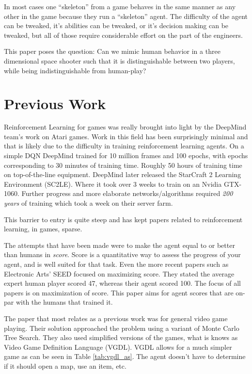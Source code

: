 \documentclass[12pt]{thesis}
\begin{document}
In most cases one ``skeleton'' from a game behaves in the same manner as any 
other in the game because they run a ``skeleton'' agent. The difficulty of the 
agent can be tweaked, it's abilities can be tweaked, or it's decision making 
can be tweaked, but all of those require considerable effort on the part of the 
engineers.

This paper poses the question: Can we mimic human behavior in a three 
dimensional space shooter such that it is distinguishable between two players, 
while being indistinguishable from human-play?



\chapter{Previous Work}
Reinforcement Learning for games was really brought into light by the DeepMind 
team's work on Atari games\cite{Atari_DM}. Work in this field has been 
surprisingly minimal and that is likely due to the difficulty in training 
reinforcement learning agents. On a simple DQN DeepMind trained for 10 million 
frames and 100 epochs, with epochs corresponding to 30 minutes of training time. 
Roughly 50 hours of training time on top-of-the-line equipment. DeepMind later 
released the StarCraft 2 Learning Environment (SC2LE)\cite{SC2LE}. Where it 
took over 3 weeks to train on an Nvidia GTX-1060. Further progress and more 
elaborate networks/algorithms required \textit{200 years} of training which 
took a week on their server farm.

This barrier to entry is quite steep and has kept papers related to 
reinforcement learning, in games, sparse.

The attempts that have been made were to make the agent equal to or better than 
humans in \textit{score}. Score is a quantitative way to assess the progress of 
your agent, and is well suited for that task. Even the more recent papers such 
as Electronic Arts' SEED\cite{EA_SEED} focused on maximizing score. They stated 
the average expert human player scored 47, whereas their agent scored 100. The 
focus of all papers is on maximization of score. This paper aims for agent 
scores that are on-par with the humans that trained it.

The paper that most relates as a previous work was for general video game 
playing\cite{Human-Like}. Their solution approached the problem using a variant 
of Monte Carlo Tree Search. They also used simplified versions of the games, 
what is knows as Video Game Definition Language (VGDL). VGDL allows for a much 
simpler game as can be seen in Table \ref{tab:vgdl_as}. The agent doesn't have 
to determine if it should open a map, use an item, etc. 
\end{document}
